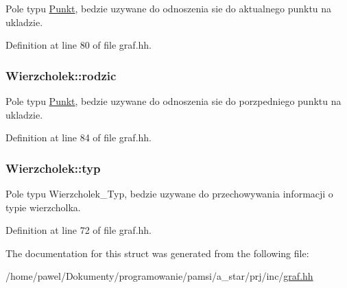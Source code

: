 Pole typu \hyperlink{struct_punkt}{Punkt}, bedzie uzywane do odnoszenia sie do aktualnego punktu na ukladzie. 



Definition at line 80 of file graf.\-hh.

\hypertarget{struct_wierzcholek_a57e48c2b959b2f2c9b416d13be59552d}{
\subsubsection[{rodzic}]{ Wierzcholek\-::rodzic}}\label{struct_wierzcholek_a57e48c2b959b2f2c9b416d13be59552d}


Pole typu \hyperlink{struct_punkt}{Punkt}, bedzie uzywane do odnoszenia sie do porzpedniego punktu na ukladzie. 



Definition at line 84 of file graf.\-hh.

\hypertarget{struct_wierzcholek_ac812fe482bda5f924cf38d48340aa018}{
\subsubsection[{typ}]{ Wierzcholek\-::typ}}\label{struct_wierzcholek_ac812fe482bda5f924cf38d48340aa018}


Pole typu Wierzcholek\-\_\-\-Typ, bedzie uzywane do przechowywania informacji o typie wierzcholka. 



Definition at line 72 of file graf.\-hh.



The documentation for this struct was generated from the following file\-:\begin{DoxyCompactItemize}
\item 
/home/pawel/\-Dokumenty/programowanie/pamsi/a\-\_\-star/prj/inc/\hyperlink{graf_8hh}{graf.\-hh}\end{DoxyCompactItemize}
